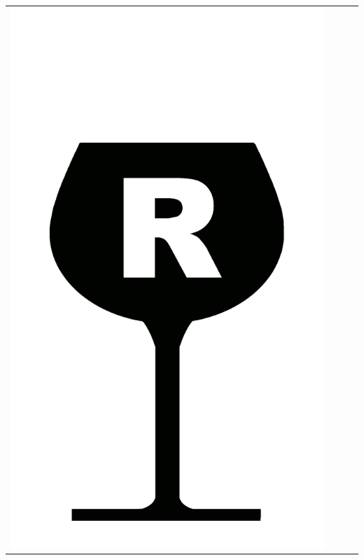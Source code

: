{\begin{center}
\begin{tabular}{ c c c c}
\includegraphics[scale=0.021, trim= 0em -5em -5em -5em,]{Icones/icon_rhone_black.pdf}
&

\end{tabular}
\end{center}}
